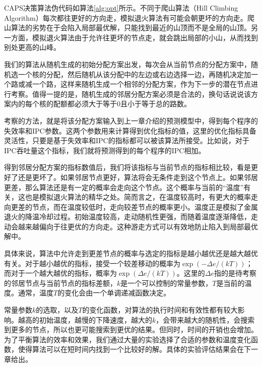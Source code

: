 CAPS决策算法伪代码如算法\ref{alg:opt}所示。不同于爬山算法（Hill Climbing Algorithm）每次都往更好的方向走，模拟退火算法有可能会朝更坏的方向走。爬山算法的劣势在于会陷入局部最优解，只能找到最近的山顶而不是全局的山顶。另一方面，模拟退火算法由于允许往更坏的节点走，就会跳出局部的小山，从而找到别处更高的山峰。

我们的算法从随机生成的初始分配方案出发，每次会从当前节点的分配方案中，随机选一个核的分配，然后随机从该分配中的左边或右边选择一边，再随机决定加一个路或减一个路，这样来随机生成一个相邻的分配方案，作为下一步的潜在节点进行考察。值得一提的是，随机生成的邻居分配方案必须是合法的，换句话说说该方案内的每个核的配额都必须大于等于0且小于等于总的路数。

考察的方法，就是将该分配方案输入到上一章介绍的预测模型中，得到每个程序的失效率和IPC参数。这两个参数用来计算得到优化指标的值，这里的优化指标具备灵活性，只要是基于失效率和IPC的指标都可以被该算法所接受。比如说，对于IPC吞吐量这个指标，我们就将预测得到的每个程序的IPC相加。

得到邻居分配方案的指标数值后，我们将该指标与当前节点的指标相比较，看是更好了还是更坏了。如果邻居节点更好，算法将会无条件走到这个节点上。如果邻居更差，那么算法还是有一定的概率会走向这个节点。这个概率与当前的“温度”有关，这也是模拟退火算法的精华之处。简而言之，在温度较高时，有更大的概率走向更差的节点，而在温度较低时，走向较差节点的概率更小。温度正是模拟了金属退火的降温冷却过程。初始温度较高，走动随机性更强，而随着温度逐渐降低，走动会越来越偏向于往更优的方向走。这种游走方式可以有效地防止陷入到局部最优解中。

具体来说，算法中允许走到更差节点的概率与选定的指标是越小越优还是越大越优有关。对于越小越优的指标，接受一个较差移动的概率为$\exp(-\Delta e / (kT))$；而对于一个越大越优的指标，概率为$\exp(\Delta e / (kT))$。这里的$\Delta e$指的是待考察的邻居节点与当前节点的指标差额，$k$是一个可以控制的常量参数，$T$是当前的温度。通常，温度$T$的变化会由一个单调递减函数决定。

常量参数$k$的选取，以及$T$的变化函数，对算法的执行时间和有效性都有较大影响。越高的初始温度，越慢的下降速度，越大的$k$，会带来越大的随机性，会搜索到更多的节点，所以也更可能搜索到更优的结果。但同时，时间的开销也会增加。为了平衡算法的效率和效果，我们通过大量的实验选择了合适的参数和温度变化函数，使得算法可以在短时间内找到一个比较好的解。具体的实验评估结果会在下一章给出。